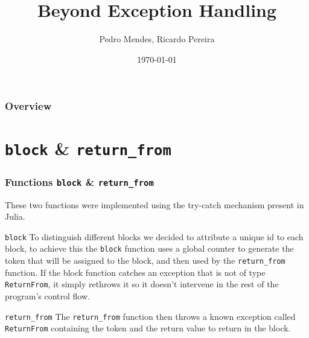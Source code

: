 \documentclass{beamer}
\title[Beyond Exception Handling]{Beyond Exception Handling} %
\author{Pedro Mendes, Ricardo Pereira} %
\institute[IST] %
{%
Instituto Superior Técnico \\ %
\medskip

}
\date{\today} %
\begin{document}
\begin{frame}
\titlepage%
\end{frame}

\begin{frame}
\frametitle{Overview} %
\tableofcontents %
\end{frame}


\section{\texttt{block} \& \texttt{return\_from}}
\begin{frame}
\frametitle{Functions \texttt{block} \& \texttt{return\_from} }

\begin{block}{}
These two functions were implemented using the try-catch mechanism present in Julia.
\end{block}

\begin{block}{\texttt{block}}
To distinguish different blocks we decided to attribute a unique id to each block, to achieve this
the \texttt{block} function uses a global counter to generate the token that will be assigned
to the block, and then used by the \texttt{return\_from} function.
If the block function catches an exception that is not of type \texttt{ReturnFrom}, it simply rethrows it
so it doesn't intervene in the rest of the program's control flow.
\end{block}

\begin{block}{\texttt{return\_from}}
The \texttt{return\_from} function then throws a known exception called \texttt{ReturnFrom} containing
the token and the return value to return in the block.
\end{block}

\end{frame}
\end{document}
